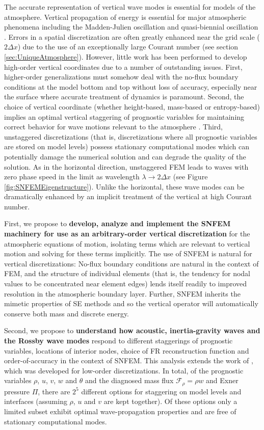 \documentclass[11pt]{article}
\begin{document}
The accurate representation of vertical wave modes is essential for models of the atmosphere.  Vertical propagation of energy is essential for major atmospheric phenomena including the Madden-Julien oscillation and quasi-biennial oscillation \cite{madden1971detection, zhang2005madden, baldwin2001quasi}.  Errors in a spatial discretization are often greatly enhanced near the grid scale ($2 \Delta x$) due to the use of an exceptionally large Courant number (see section \ref{sec:UniqueAtmosphere}).  However, little work has been performed to develop high-order vertical coordinates due to a number of outstanding issues.  First, higher-order generalizations must somehow deal with the no-flux boundary conditions at the model bottom and top without loss of accuracy, especially near the surface where accurate treatment of dynamics is paramount.  Second, the choice of vertical coordinate (whether height-based, mass-based or entropy-based) implies an optimal vertical staggering of prognostic variables for maintaining correct behavior for wave motions relevant to the atmosphere \cite{thuburn2005vertical, JT2006QJRMS, MDTRDA2007JCP}.  Third, unstaggered discretizations (that is, discretizations where all prognostic variables are stored on model levels) possess stationary computational modes which can potentially damage the numerical solution and can degrade the quality of the solution.  As in the horizontal direction, unstaggered FEM leads to waves with zero phase speed in the limit as wavelength $\lambda \to 2 \Delta x$ (see Figure \ref{fig:SNFEMEigenstructure}).  Unlike the horizontal, these wave modes can be dramatically enhanced by an implicit treatment of the vertical at high Courant number.

First, we propose to \textbf{develop, analyze and implement the SNFEM machinery for use as an arbitrary-order vertical discretization} for the atmospheric equations of motion, isolating terms which are relevant to vertical motion and solving for these terms implicitly.  The use of SNFEM is natural for vertical discretizations:  No-flux boundary conditions are natural in the context of FEM, and the structure of individual elements (that is, the tendency for nodal values to be concentrated near element edges) lends itself readily to improved resolution in the atmospheric boundary layer.  Further, SNFEM inherits the mimetic properties of SE methods and so the vertical operator will automatically conserve both mass and discrete energy.

Second, we propose to \textbf{understand how acoustic, inertia-gravity waves and the Rossby wave modes} respond to different staggerings of prognostic variables, locations of interior nodes, choice of FR reconstruction function and order-of-accuracy in the context of SNFEM.  This analysis extends the work of \cite{thuburn2005vertical}, which was developed for low-order discretizations.  In total, of the prognostic variables $\rho$, $u$, $v$, $w$ and $\theta$ and the diagnosed mass flux $\mathcal{F}_\rho = \rho w$ and Exner pressure $\Pi$, there are $2^5$ different options for staggering on model levels and interfaces (assuming $\rho$, $u$ and $v$ are kept together).  Of these options only a limited subset exhibit optimal wave-propagation properties and are free of stationary computational modes.
\end{document}
